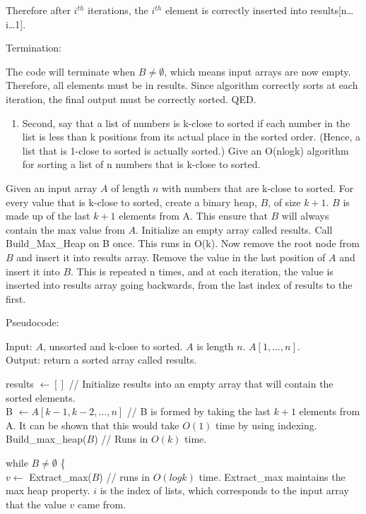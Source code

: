 \documentclass[11pt]{article}
\providecommand{\tightlist}{%
      \setlength{\itemsep}{0pt}\setlength{\parskip}{0pt}}
\begin{document}
Therefore after \(i^{th}\) iterations, the \(i^{th}\) element is
correctly inserted into results{[}n\ldots i\ldots1{]}.

Termination:

The code will terminate when \(B \neq \emptyset\), which means input
arrays are now empty. Therefore, all elements must be in results. Since
algorithm correctly sorts at each iteration, the final output must be
correctly sorted. QED.

    \begin{enumerate}
\def\labelenumi{\arabic{enumi}.}
\tightlist
\item
  Second, say that a list of numbers is k-close to sorted if each number
  in the list is less than k positions from its actual place in the
  sorted order. (Hence, a list that is 1-close to sorted is actually
  sorted.) Give an O(nlogk) algorithm for sorting a list of n numbers
  that is k-close to sorted.
\end{enumerate}

    Given an input array \(A\) of length \(n\) with numbers that are k-close
to sorted. For every value that is k-close to sorted, create a binary
heap, \(B\), of size \(k+1\). \(B\) is made up of the last \(k+1\)
elements from A. This ensure that \(B\) will always contain the max
value from \(A\). Initialize an empty array called results. Call
Build\_Max\_Heap on B once. This runs in O(k). Now remove the root node
from \(B\) and insert it into results array. Remove the value in the
last position of \(A\) and insert it into \(B\). This is repeated n
times, and at each iteration, the value is inserted into results array
going backwards, from the last index of results to the first.

Pseudocode:

Input: \(A\), unsorted and k-close to sorted. \(A\) is length \(n\).
\(A[1, ..., n]\).\\
Output: return a sorted array called results.

results \(\leftarrow [ ]\) // Initialize results into an empty array
that will contain the sorted elements.\\
B \(\leftarrow A[k-1, k-2, ..., n]\) // B is formed by taking the last
\(k+1\) elements from A. It can be shown that this would take \(O(1)\)
time by using indexing.\\
Build\_max\_heap(\(B\)) // Runs in \(O(k)\) time.

while \(B \neq \emptyset\) \{\\
\(v \leftarrow\) Extract\_max(\(B\)) // runs in \(O(logk)\) time.
Extract\_max maintains the max heap property. \(i\) is the index of
lists, which corresponds to the input array that the value \(v\) came
from.
\end{document}
